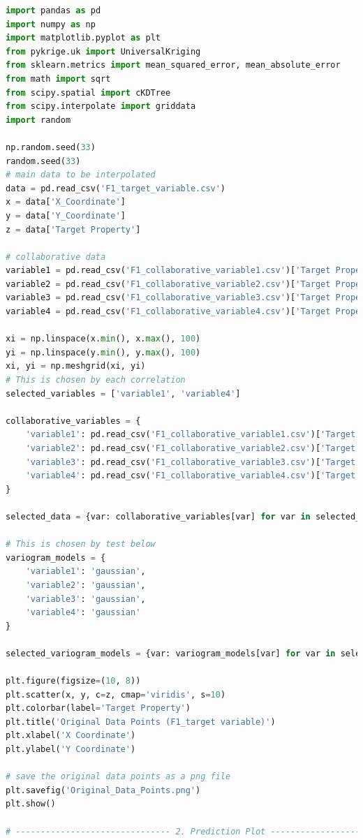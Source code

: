 \documentclass{swmcmthesis}
\begin{document}
\begin{lstlisting}[language=python,caption={The python programme for Problem 3 - Regression Kriging}]
import pandas as pd
import numpy as np
import matplotlib.pyplot as plt
from pykrige.uk import UniversalKriging
from sklearn.metrics import mean_squared_error, mean_absolute_error
from math import sqrt
from scipy.spatial import cKDTree
from scipy.interpolate import griddata
import random

np.random.seed(33)
random.seed(33)
# main data to be interpolated
data = pd.read_csv('F1_target_variable.csv')
x = data['X_Coordinate']
y = data['Y_Coordinate']
z = data['Target Property']

# collaborative data
variable1 = pd.read_csv('F1_collaborative_variable1.csv')['Target Property']
variable2 = pd.read_csv('F1_collaborative_variable2.csv')['Target Property']
variable3 = pd.read_csv('F1_collaborative_variable3.csv')['Target Property']
variable4 = pd.read_csv('F1_collaborative_variable4.csv')['Target Property']

xi = np.linspace(x.min(), x.max(), 100)
yi = np.linspace(y.min(), y.max(), 100)
xi, yi = np.meshgrid(xi, yi)
# This is chosen by each correlation
selected_variables = ['variable1', 'variable4']

collaborative_variables = {
    'variable1': pd.read_csv('F1_collaborative_variable1.csv')['Target Property'],
    'variable2': pd.read_csv('F1_collaborative_variable2.csv')['Target Property'],
    'variable3': pd.read_csv('F1_collaborative_variable3.csv')['Target Property'],
    'variable4': pd.read_csv('F1_collaborative_variable4.csv')['Target Property']
}

selected_data = {var: collaborative_variables[var] for var in selected_variables}

# This is chosen by test below
variogram_models = {
    'variable1': 'gaussian',
    'variable2': 'gaussian',
    'variable3': 'gaussian',
    'variable4': 'gaussian'
}

selected_variogram_models = {var: variogram_models[var] for var in selected_variables}

plt.figure(figsize=(10, 8))
plt.scatter(x, y, c=z, cmap='viridis', s=10)
plt.colorbar(label='Target Property')  
plt.title('Original Data Points (F1_target variable)')
plt.xlabel('X Coordinate')
plt.ylabel('Y Coordinate')

# save the original data points as a png file
plt.savefig('Original_Data_Points.png')
plt.show()

# ------------------------------- 2. Prediction Plot ------------------------------- #


\end{lstlisting}
\end{document}
